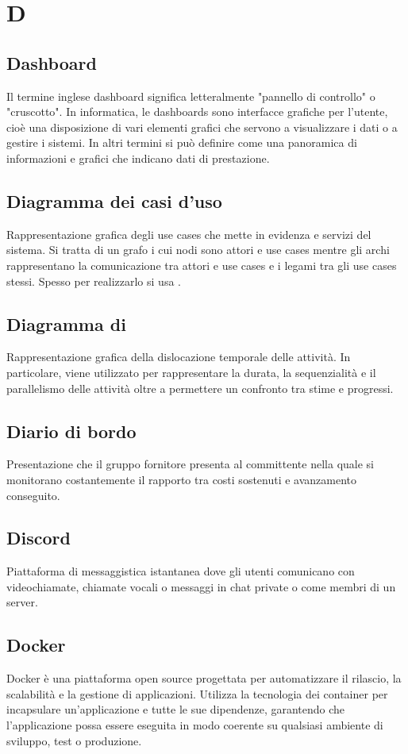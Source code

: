 \chapter{D}


\section{Dashboard}
Il termine inglese dashboard significa letteralmente "pannello di controllo" o "cruscotto". In informatica, le dashboards sono interfacce grafiche per l'utente, cioè una disposizione di vari elementi grafici che servono a visualizzare i dati o a gestire i sistemi. In altri termini si può definire come una panoramica di informazioni e grafici che indicano dati di prestazione.

\section{Diagramma dei casi d'uso}\label{sec:Diagrammi dei casi d'uso}
Rappresentazione grafica degli use cases che mette in evidenza  e servizi del sistema. Si tratta di un grafo i cui nodi sono attori e use cases mentre gli archi rappresentano la comunicazione tra attori e use cases e i legami tra gli use cases stessi. Spesso per realizzarlo si usa .

\section{Diagramma di }\label{sec:Diagrammi di Gantt}
Rappresentazione grafica della dislocazione temporale delle attività. In particolare, viene utilizzato per rappresentare la durata, la sequenzialità e il parallelismo delle attività oltre a permettere un confronto tra stime e progressi.

\section{Diario di bordo}\label{sec:Diari di bordo}
Presentazione che il gruppo fornitore presenta al committente nella quale si monitorano costantemente il rapporto tra costi sostenuti e avanzamento conseguito.

\section{Discord}
Piattaforma di messaggistica istantanea dove gli utenti comunicano con videochiamate, chiamate vocali o messaggi in chat private o come membri di un server.

\section{Docker}
Docker è una piattaforma open source progettata per automatizzare il rilascio, la scalabilità e la gestione di applicazioni. Utilizza la tecnologia dei container per incapsulare un'applicazione e tutte le sue dipendenze, garantendo che l'applicazione possa essere eseguita in modo coerente su qualsiasi ambiente di sviluppo, test o produzione.
